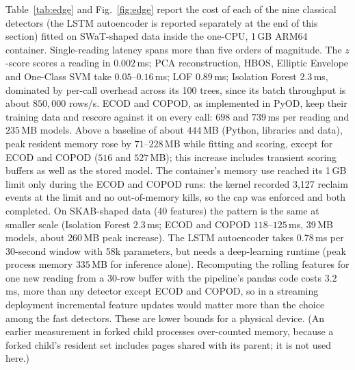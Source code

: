 \documentclass[11pt]{article}
\begin{document}
Table~\ref{tab:edge} and Fig.~\ref{fig:edge} report the cost of each of the nine classical detectors
(the LSTM autoencoder is reported separately at the end of this section)
fitted on SWaT-shaped data inside the
one-CPU, 1\,GB ARM64 container. Single-reading latency spans more than five orders of
magnitude. The $z$-score scores a reading in $0.002$\,ms; PCA reconstruction, HBOS,
Elliptic Envelope and One-Class SVM take $0.05$--$0.16$\,ms; LOF $0.89$\,ms;
Isolation Forest $2.3$\,ms, dominated by per-call overhead across its 100 trees,
since its batch throughput is about $850{,}000$ rows/s. ECOD and COPOD, as
implemented in PyOD, keep their training data and rescore against it on every
call: $698$ and $739$\,ms per reading and $235$\,MB models. Above a baseline of
about $444$\,MB (Python, libraries and data), peak resident memory rose by
$71$--$228$\,MB while fitting and scoring, except for ECOD and COPOD ($516$ and
$527$\,MB); this increase includes transient scoring buffers as well as the stored
model. The container's memory
use reached its 1\,GB limit only during the ECOD and COPOD runs: the kernel recorded
3{,}127 reclaim events at the limit and no out-of-memory kills, so the cap was
enforced and both completed. On SKAB-shaped data (40 features) the pattern is the
same at smaller scale (Isolation Forest $2.3$\,ms; ECOD and COPOD $118$--$125$\,ms,
39\,MB models, about $260$\,MB peak increase). The LSTM autoencoder takes $0.78$\,ms
per 30-second window with 58k parameters, but needs a deep-learning runtime (peak
process memory $335$\,MB for inference alone). Recomputing the rolling features for
one new reading from a 30-row buffer with the pipeline's pandas code costs
$3.2$\,ms, more than any detector except ECOD and COPOD, so in a streaming
deployment incremental feature updates would matter more than the choice among the
fast detectors. These are lower bounds for a physical device. (An earlier
measurement in forked child processes over-counted memory, because a forked child's
resident set includes pages shared with its parent; it is not used here.)
\end{document}
